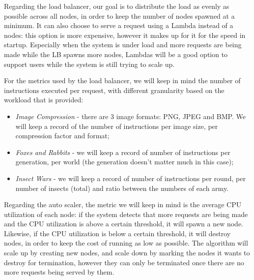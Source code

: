 \documentclass{article}
\begin{document}
Regarding the load balancer, our goal is to distribute the load as evenly as
possible across all nodes, in order to keep the number of nodes spawned at a
minimum. It can also choose to serve a request using a Lambda instead of a
nodes: this option is more expensive, however it makes up for it for the speed
in startup. Especially when the system is under load and more requests are being
made while the LB spawns more nodes, Lambdas will be a good option to support
users while the system is still trying to scale up.

For the metrics used by the load balancer, we will keep in mind the number of
instructions executed per request, with different granularity based on the
workload that is provided:

\begin{itemize}
    \item \textit{Image Compression} - there are 3 image formats: PNG, JPEG and
        BMP. We will keep a record of the number of instructions per image size,
        per compression factor and format;
    \item \textit{Foxes and Rabbits} - we will keep a record of number of
        instructions per generation, per world (the generation doesn't matter
        much in this case);
    \item \textit{Insect Wars} - we will keep a record of number of instructions
        per round, per number of insects (total) and ratio between the numbers
        of each army.
\end{itemize}

Regarding the auto scaler, the metric we will keep in mind is the average CPU
utilization of each node: if the system detects that more requests are being
made and the CPU utilization is above a certain threshold, it will spawn a new
node. Likewise, if the CPU utilization is below a certain threshold, it will
destroy nodes, in order to keep the cost of running as low as possible. The
algorithm will scale up by creating new nodes, and scale down by marking the
nodes it wants to destroy for termination, however they can only be terminated
once there are no more requests being served by them.
\end{document}
